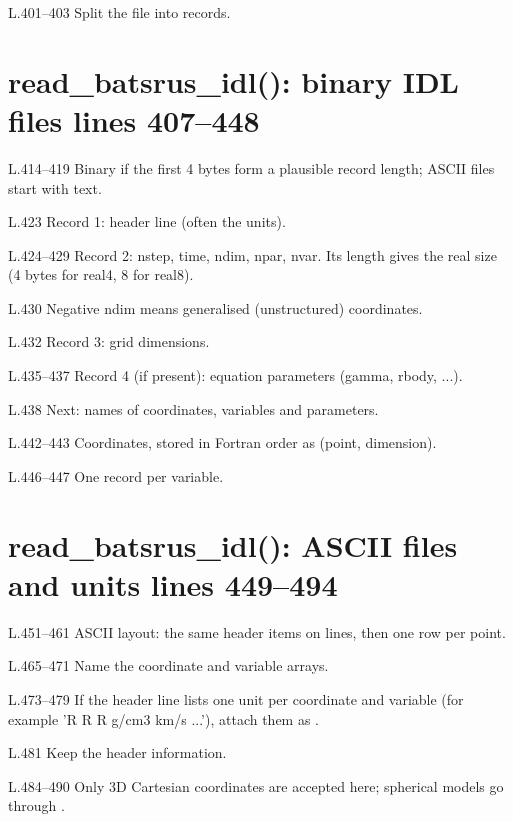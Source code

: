 \begin{lines}
\item[L.401–403] Split the file into records.
\end{lines}
\section*{\normalsize read\_batsrus\_idl(): binary IDL files \hfill{\small\mdseries\color{gray}lines 407--448}}

\begin{lines}
\item[L.414–419] Binary if the first 4 bytes form a plausible record length; ASCII files start with text.
\item[L.423] Record 1: header line (often the units).
\item[L.424–429] Record 2: nstep, time, ndim, npar, nvar. Its length gives the real size (4 bytes for real4, 8 for real8).
\item[L.430] Negative ndim means generalised (unstructured) coordinates.
\item[L.432] Record 3: grid dimensions.
\item[L.435–437] Record 4 (if present): equation parameters (gamma, rbody, ...).
\item[L.438] Next: names of coordinates, variables and parameters.
\item[L.442–443] Coordinates, stored in Fortran order as (point, dimension).
\item[L.446–447] One record per variable.
\end{lines}
\section*{\normalsize read\_batsrus\_idl(): ASCII files and units \hfill{\small\mdseries\color{gray}lines 449--494}}

\begin{lines}
\item[L.451–461] ASCII layout: the same header items on lines, then one row per point.
\item[L.465–471] Name the coordinate and variable arrays.
\item[L.473–479] If the header line lists one unit per coordinate and variable (for example 'R R R g/cm3 km/s ...'), attach them as .
\item[L.481] Keep the header information.
\item[L.484–490] Only 3D Cartesian coordinates are accepted here; spherical models go through .
\end{lines}
